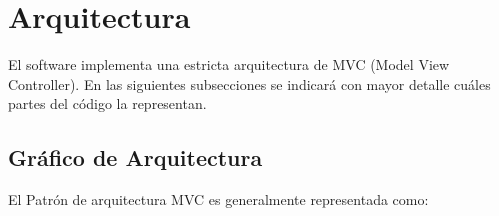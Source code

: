 \documentclass[10pt]{article} %
\begin{document}
\begin{figure}[H] %
\label{fig:DiagramaDeActividad_Pre}
\end{figure}







\section{Arquitectura}
El software implementa una estricta arquitectura de MVC (Model View Controller). En las siguientes subsecciones se indicará con mayor detalle cuáles partes del código la representan.

\subsection{Gráfico de Arquitectura}
El Patrón de arquitectura MVC es generalmente representada como:

\begin{figure}[H] %
\label{fig:GenericMVC}
\end{figure}
\end{document}
